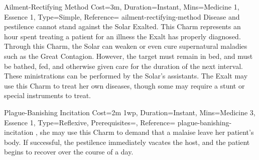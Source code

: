 \begin{Charm}{Ailment-Rectifying Method}{
    Cost=3m,
    Duration=Instant,
    Mins={Medicine 1, Essence 1},
    Type=Simple,
    Reference=\cite*[p.~341]{ex3}
}{ailment-rectifying-method}
    Disease  and  pestilence  cannot  stand  against  the  Solar Exalted. This
    Charm represents an hour spent treating a patient for an illness the Exalt
    has properly diagnosed.  Through this Charm, the Solar can weaken or even cure
    supernatural maladies such as the Great Contagion. However, the target must
    remain in bed, and must be bathed, fed, and otherwise given care for the
    duration of the next interval. These ministrations can be performed by the
    Solar’s assistants. The Exalt may use this Charm to treat her own diseases,
    though some may require a stunt or special instruments to treat.
\end{Charm}

\begin{Charm}{Plague-Banishing Incitation}{
    Cost=2m 1wp,
    Duration=Instant,
    Mins={Medicine 3, Essence 1},
    Type=Reflexive,
    Prerequisites=,
    Reference=\cite*[p.~341]{ex3}
}{plague-banishing-incitation}
    , she may use this Charm to demand that a malaise leave her
    patient’s body.  If successful, the
    pestilence immediately vacates the host, and the patient begins to recover
    over the course of a day. 
\end{Charm}

